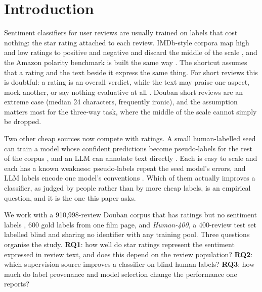 
\section{Introduction}
\label{sec:intro}

Sentiment classifiers for user reviews are usually trained on labels
that cost nothing: the star rating attached to each review. IMDb-style
corpora map high and low ratings to positive and negative and discard
the middle of the scale \citep{maas2011}, and the Amazon polarity
benchmark is built the same way \citep{zhang2015char}. The shortcut assumes
that a rating and the text beside it express the same thing. For
short reviews this is doubtful: a rating is an overall verdict, while
the text may praise one aspect, mock another, or say nothing
evaluative at all \citep{pang2005seeing}. Douban short reviews are an
extreme case (median 24 characters, frequently ironic), and the
assumption matters most for the three-way task, where the middle of
the scale cannot simply be dropped.

Two other cheap sources now compete with ratings. A small
human-labelled seed can train a model whose confident predictions
become pseudo-labels for the rest of the corpus
\citep{lee2013pseudo,xie2020selftraining}, and an LLM can annotate
text directly \citep{gilardi2023,tan2024survey}. Each is easy to
scale and each has a known weakness: pseudo-labels repeat the seed
model's errors, and LLM labels encode one model's conventions
\citep{moller2024parrot}. Which of them actually improves a
classifier, as judged by people rather than by more cheap labels, is
an empirical question, and it is the one this paper asks.

We work with a 910{,}998-review Douban corpus that has ratings but no
sentiment labels \citep{moviedata10m}, 600 gold labels from one film
page, and \emph{Human-400}, a 400-review test set labelled blind and
sharing no identifier with any training pool. Three questions
organise the study. \textbf{RQ1}: how well do star ratings represent
the sentiment expressed in review text, and does this depend on the
review population? \textbf{RQ2}: which supervision source improves a
classifier on blind human labels? \textbf{RQ3}: how much do label
provenance and model selection change the performance one reports?

